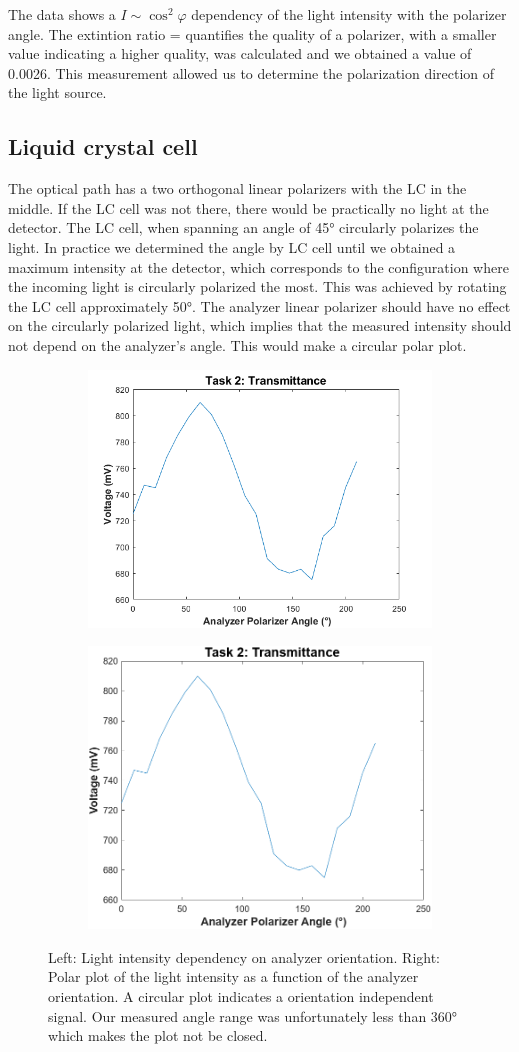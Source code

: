 \documentclass[12pt,a4paper]{article}
\begin{document}
The data shows a $I \sim \cos^2\varphi$ dependency of the light intensity with the polarizer angle. The extintion ratio =  quantifies the quality of a polarizer, with a smaller value indicating a higher quality, was calculated and we obtained a value of 0.0026. This measurement allowed us to determine the polarization direction of the light source.


\subsection{Liquid crystal cell}

 The optical path has a two orthogonal linear polarizers with the LC in the middle. If the LC cell was not there, there would be practically no light at the detector. The LC cell, when spanning an angle of 45° circularly polarizes the light. In practice we determined the angle by LC cell until we obtained a maximum intensity at the detector, which corresponds to the configuration where the incoming light is circularly polarized the most. This was achieved by rotating the LC cell approximately 50°. The analyzer linear polarizer should have no effect on the circularly polarized light, which implies that the measured intensity should not depend on the analyzer's angle. This would make a circular polar plot.

\begin{figure}[H]
    \centering
    \begin{subfigure}{\linewidth}
        \centering
    \includegraphics[width=0.35\linewidth]{figs/task2_transmittance.png}
    \end{subfigure}
    
    \vspace{1em} %

    \begin{subfigure}{\linewidth}
        \centering
    \includegraphics[width=0.35\linewidth]{figs/task2_polar.png}
    \end{subfigure}
    
    \caption{Left: Light intensity dependency on analyzer orientation. Right: Polar plot of the light intensity as a function of the analyzer orientation. A circular plot indicates a orientation independent signal. Our measured angle range was unfortunately less than 360° which makes the plot not be closed.}
    \label{fig:t2}
\end{figure}
\end{document}
